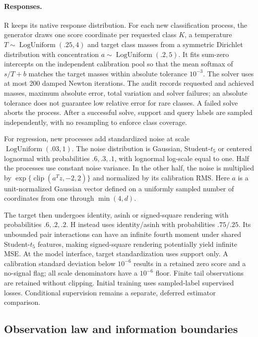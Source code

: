 \documentclass[11pt]{article}
\begin{document}
\paragraph{Responses.}
R keeps its native response distribution. For each new classification process, the generator draws one score coordinate per requested class $K$, a temperature $T\sim\operatorname{LogUniform}(.25,4)$ and target class masses from a symmetric Dirichlet distribution with concentration $a\sim\operatorname{LogUniform}(.2,5)$. It fits sum-zero intercepts on the independent calibration pool so that the mean softmax of $s/T+b$ matches the target masses within absolute tolerance $10^{-3}$. The solver uses at most 200 damped Newton iterations. The audit records requested and achieved masses, maximum absolute error, total variation and solver failures; an absolute tolerance does not guarantee low relative error for rare classes. A failed solve aborts the process. After a successful solve, support and query labels are sampled independently, with no resampling to enforce class coverage.

For regression, new processes add standardized noise at scale $\operatorname{LogUniform}(.03,1)$. The noise distribution is Gaussian, Student-$t_5$ or centered lognormal with probabilities $.6,.3,.1$, with lognormal log-scale equal to one. Half the processes use constant noise variance. In the other half, the noise is multiplied by $\exp\{\operatorname{clip}(a^Tz,-2,2)\}$ and normalized by its calibration RMS. Here $a$ is a unit-normalized Gaussian vector defined on a uniformly sampled number of coordinates from one through $\min(4,d)$.

The target then undergoes identity, asinh or signed-square rendering with probabilities $.6,.2,.2$. H instead uses identity/asinh with probabilities $.75/.25$. Its unbounded pair interactions can have an infinite fourth moment under shared Student-$t_5$ features, making signed-square rendering potentially yield infinite MSE. At the model interface, target standardization uses support only. A calibration standard deviation below $10^{-6}$ results in a retained zero score and a no-signal flag; all scale denominators have a $10^{-6}$ floor. Finite tail observations are retained without clipping. Initial training uses sampled-label supervised losses. Conditional supervision remains a separate, deferred estimator comparison.

\subsection{Observation law and information boundaries}
\end{document}
